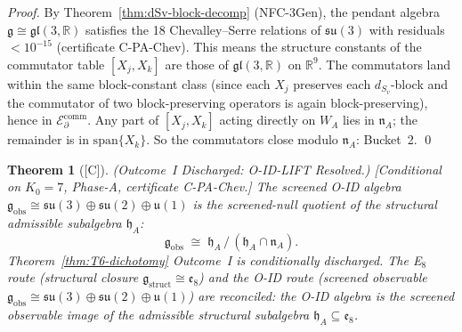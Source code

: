 \documentclass[12pt,oneside]{amsbook}
\theoremstyle{plain}
\newtheorem{theorem}{Theorem}[section]
\theoremstyle{definition}
\theoremstyle{remark}
\newcommand{\status}[1]{\textup{[#1]}}
\begin{document}
\begin{proof}
By Theorem~\ref{thm:dSv-block-decomp} (NFC-3Gen), the pendant algebra
$\mathfrak{g} \cong \mathfrak{gl}(3,\mathbb{R})$ satisfies the 18
Chevalley--Serre relations of $\mathfrak{su}(3)$ with residuals
$<10^{-15}$ (certificate C-PA-Chev). This means the structure
constants of the commutator table $[X_j, X_k]$ are those of
$\mathfrak{gl}(3,\mathbb{R})$ on $\mathbb{R}^9$. The commutators
land within the same block-constant class (since each $X_j$
preserves each $d_{S_v}$-block and the commutator of two
block-preserving operators is again block-preserving), hence in
$\mathcal{E}_\partial^{\mathrm{comm}}$. Any part of $[X_j,X_k]$
acting directly on $W_A$ lies in $\mathfrak{n}_A$; the remainder
is in $\mathrm{span}\{X_k\}$. So the commutators close modulo
$\mathfrak{n}_A$: Bucket~2. \qed
\end{proof}

\begin{theorem}[\status{C}]\label{thm:Outcome-I-discharged}
\textup{(Outcome~I Discharged: O-ID-LIFT Resolved.)}
\textup{[Conditional on $K_0=7$, Phase-A, certificate C-PA-Chev.]}
The screened O-ID algebra
$\mathfrak{g}_{\mathrm{obs}} \cong
\mathfrak{su}(3)\oplus\mathfrak{su}(2)\oplus\mathfrak{u}(1)$
is the screened-null quotient of the structural admissible subalgebra
$\mathfrak{h}_A$:
\[
 \mathfrak{g}_{\mathrm{obs}}
 \;\cong\;
 \mathfrak{h}_A \,/\,(\mathfrak{h}_A \cap \mathfrak{n}_A).
\]
Theorem~\ref{thm:T6-dichotomy} Outcome~I is conditionally discharged.
The E$_8$ route (structural closure $\mathfrak{g}_{\mathrm{struct}}
\cong \mathfrak{e}_8$) and the O-ID route (screened observable
$\mathfrak{g}_{\mathrm{obs}} \cong
\mathfrak{su}(3)\oplus\mathfrak{su}(2)\oplus\mathfrak{u}(1)$)
are reconciled: the O-ID algebra is the screened observable image
of the admissible structural subalgebra
$\mathfrak{h}_A \subseteq \mathfrak{e}_8$.
\end{theorem}
\end{document}
